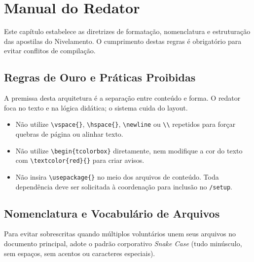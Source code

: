 
\section{Manual do Redator}
\label{sec:niv_tutotial_redator}

Este capítulo estabelece as diretrizes de formatação, nomenclatura e estruturação das apostilas do Nivelamento. O cumprimento destas regras é obrigatório para evitar conflitos de compilação.

\subsection{Regras de Ouro e Práticas Proibidas}
\label{subsec:niv_regras_do_redator}

A premissa desta arquitetura é a separação entre conteúdo e forma. O redator foca no texto e na lógica didática; o sistema cuida do layout.

\begin{itemize}
    \item Não utilize \verb|\vspace{}|, \verb|\hspace{}|, \verb|\newline| ou \verb|\\| repetidos para forçar quebras de página ou alinhar texto.

    \item Não utilize \verb|\begin{tcolorbox}| diretamente, nem modifique a cor do texto com \verb|\textcolor{red}{}| para criar avisos.

    \item Não insira \verb|\usepackage{}| no meio dos arquivos de conteúdo. Toda dependência deve ser solicitada à coordenação para inclusão no \verb|/setup|.
\end{itemize}

\subsection{Nomenclatura e Vocabulário de Arquivos}
\label{subsec:niv_tutotial_nomenclatura_de_arquivos}

Para evitar sobrescritas quando múltiplos voluntários unem seus arquivos no documento principal, adote o padrão corporativo \textit{Snake Case} (tudo minúsculo, sem espaços, sem acentos ou caracteres especiais).

